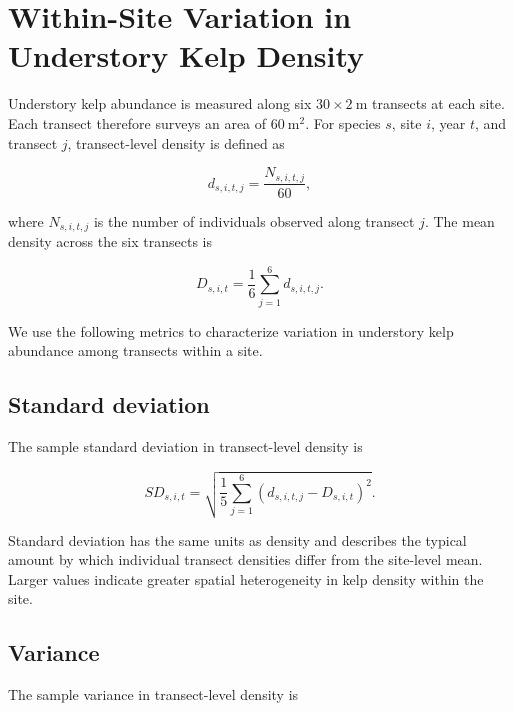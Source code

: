 \documentclass[11pt]{article}
\begin{document}
	
	\raggedright
	\setlength{\parindent}{0pt}
	
	\section*{Within-Site Variation in Understory Kelp Density}
	
	Understory kelp abundance is measured along six \(30 \times 2\ \mathrm{m}\)
	transects at each site. Each transect therefore surveys an area of
	\(60\ \mathrm{m}^{2}\). For species \(s\), site \(i\), year \(t\), and
	transect \(j\), transect-level density is defined as
	
	\begin{equation}
		d_{s,i,t,j}
		=
		\frac{N_{s,i,t,j}}{60},
	\end{equation}
	
	where \(N_{s,i,t,j}\) is the number of individuals observed along
	transect \(j\). The mean density across the six transects is
	
	\begin{equation}
		D_{s,i,t}
		=
		\frac{1}{6}
		\sum_{j=1}^{6}
		d_{s,i,t,j}.
	\end{equation}
	
	We use the following metrics to characterize variation in understory
	kelp abundance among transects within a site.
	
	\subsection*{Standard deviation}
	
	The sample standard deviation in transect-level density is
	
	\begin{equation}
		SD_{s,i,t}
		=
		\sqrt{
			\frac{1}{5}
			\sum_{j=1}^{6}
			\left(d_{s,i,t,j}-D_{s,i,t}\right)^2
		}.
	\end{equation}
	
	Standard deviation has the same units as density and describes the
	typical amount by which individual transect densities differ from the
	site-level mean. Larger values indicate greater spatial heterogeneity
	in kelp density within the site.
	
	\subsection*{Variance}
	
	The sample variance in transect-level density is
	
\end{document}
